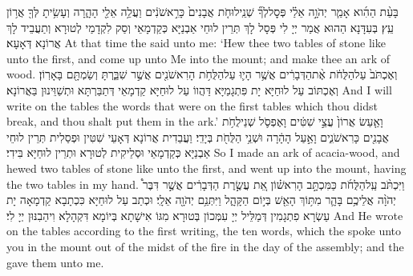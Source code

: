 \newperek
\newseder
{}%
{בָּעֵ֨ת הַהִ֜וא אָמַ֧ר יְהֹוָ֣ה אֵלַ֗י פְּסׇל\maqqaf לְךָ֞ שְׁנֵֽי\maqqaf לוּחֹ֤ת אֲבָנִים֙ כָּרִ֣אשֹׁנִ֔ים וַעֲלֵ֥ה אֵלַ֖י הָהָ֑רָה וְעָשִׂ֥יתָ לְּךָ֖ אֲר֥וֹן עֵֽץ׃}
{בְּעִדָּנָא הַהוּא אֲמַר יְיָ לִי פְּסָל לָךְ תְּרֵין לוּחֵי אַבְנַיָּא כְּקַדְמָאֵי וְסַק לִקְדָמַי לְטוּרָא וְתַעֲבֵיד לָךְ אֲרוֹנָא דְּאָעָא׃}
{At that time the \lord\space said unto me: ‘Hew thee two tables of stone like unto the first, and come up unto Me into the mount; and make thee an ark of wood.}{}
{וְאֶכְתֹּב֙ עַל\maqqaf הַלֻּחֹ֔ת אֶ֨ת\maqqaf הַדְּבָרִ֔ים אֲשֶׁ֥ר הָי֛וּ עַל\maqqaf הַלֻּחֹ֥ת הָרִאשֹׁנִ֖ים אֲשֶׁ֣ר שִׁבַּ֑רְתָּ וְשַׂמְתָּ֖ם בָּאָרֽוֹן׃}
{וְאֶכְתּוֹב עַל לוּחַיָּא יָת פִּתְגָמַיָּא דַּהֲווֹ עַל לוּחַיָּא קַדְמָאֵי דְּתַבַּרְתָּא וּתְשַׁוֵּינוּן בַּאֲרוֹנָא׃}
{And I will write on the tables the words that were on the first tables which thou didst break, and thou shalt put them in the ark.’}{}
{וָאַ֤עַשׂ אֲרוֹן֙ עֲצֵ֣י שִׁטִּ֔ים וָאֶפְסֹ֛ל שְׁנֵי\maqqaf לֻחֹ֥ת אֲבָנִ֖ים כָּרִאשֹׁנִ֑ים וָאַ֣עַל הָהָ֔רָה וּשְׁנֵ֥י הַלֻּחֹ֖ת בְּיָדִֽי׃}
{וַעֲבַדִית אֲרוֹנָא דְּאָעֵי שִׁטִּין וּפְסַלִית תְּרֵין לוּחֵי אַבְנַיָּא כְּקַדְמָאֵי וּסְלֵיקִית לְטוּרָא וּתְרֵין לוּחַיָּא בִּידִי׃}
{So I made an ark of acacia-wood, and hewed two tables of stone like unto the first, and went up into the mount, having the two tables in my hand.}{}
{וַיִּכְתֹּ֨ב עַֽל\maqqaf הַלֻּחֹ֜ת כַּמִּכְתָּ֣ב הָרִאשׁ֗וֹן אֵ֚ת עֲשֶׂ֣רֶת הַדְּבָרִ֔ים אֲשֶׁ֣ר דִּבֶּר֩ יְהֹוָ֨ה אֲלֵיכֶ֥ם בָּהָ֛ר מִתּ֥וֹךְ הָאֵ֖שׁ בְּי֣וֹם הַקָּהָ֑ל וַיִּתְּנֵ֥ם יְהֹוָ֖ה אֵלָֽי׃}
{וּכְתַב עַל לוּחַיָּא כִּכְתָבָא קַדְמָאָה יָת עַשְׂרָא פִתְגָמִין דְּמַלֵּיל יְיָ עִמְּכוֹן בְּטוּרָא מִגּוֹ אִישָׁתָא בְּיוֹמָא דִּקְהָלָא וִיהַבִנּוּן יְיָ לִי׃}
{And He wrote on the tables according to the first writing, the ten words, which the \lord\space spoke unto you in the mount out of the midst of the fire in the day of the assembly; and the \lord\space gave them unto me.}{}
